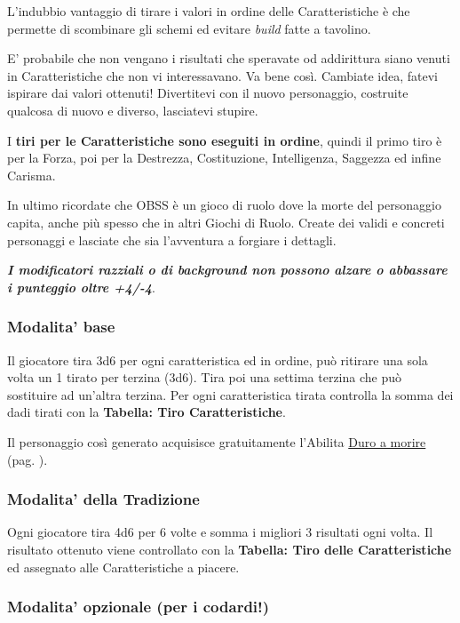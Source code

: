 \begin{multicols}{2}
L'indubbio vantaggio di tirare i valori in ordine delle Caratteristiche è che permette di scombinare gli schemi ed evitare \emph{build} fatte a tavolino.

E' probabile che non vengano i risultati che speravate od addirittura siano venuti in Caratteristiche che non vi interessavano. Va bene così. Cambiate idea, fatevi ispirare dai valori ottenuti! Divertitevi con il nuovo personaggio, costruite qualcosa di nuovo e diverso, lasciatevi stupire.

I \textbf{tiri per le Caratteristiche sono eseguiti in ordine}, quindi il primo tiro è per la Forza, poi per la Destrezza, Costituzione, Intelligenza, Saggezza ed infine Carisma.

In ultimo ricordate che OBSS è un gioco di ruolo dove la morte del personaggio capita, anche più spesso che in altri Giochi di Ruolo. Create dei validi e concreti personaggi e lasciate che sia l'avventura a forgiare i dettagli.

\textbf{\emph{I modificatori razziali o di background non possono alzare o abbassare i punteggio oltre +4/-4}}.

\subsubsection{Modalita' base}\label{modalitabase}

Il giocatore tira 3d6 per ogni caratteristica ed in ordine, può ritirare una sola volta un 1 tirato per terzina (3d6). Tira poi una settima terzina che può sostituire ad un'altra terzina. Per ogni caratteristica tirata controlla la somma dei dadi tirati con la \textbf{Tabella: Tiro Caratteristiche}.

Il personaggio così generato acquisisce gratuitamente l'Abilita \hyperlink{Duro a morire}{Duro a morire} (pag. \pageref{Duro a morire}).

\subsubsection{Modalita' della Tradizione}\label{modalitadellatradizione}

Ogni giocatore tira 4d6 per 6 volte e somma i migliori 3 risultati ogni volta. Il risultato ottenuto viene controllato con la \textbf{Tabella: Tiro delle Caratteristiche} ed assegnato alle Caratteristiche a piacere.

\subsubsection{Modalita' opzionale (per i codardi!)}\label{modalitapericodardi}


\end{multicols}
